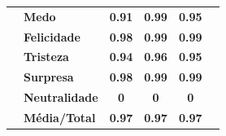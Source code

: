 \documentclass{beamer}
\begin{document}
\begin{frame}
\begin{table}[]
\begin{tabular}{llcccc}
                                       & \textbf{Medo}         & \textbf{0.91}                         & \textbf{0.99}                          & \textbf{0.95}                         &                                       \\
                                       & \textbf{Felicidade}   & \textbf{0.98}                         & \textbf{0.99}                          & \textbf{0.99}                         &                                       \\
                                       & \textbf{Tristeza}     & \textbf{0.94}                         & \textbf{0.96}                          & \textbf{0.95}                         &                                       \\
                                       & \textbf{Surpresa}     & \textbf{0.98}                         & \textbf{0.99}                          & \textbf{0.99}                         &                                       \\
                                       & \textbf{Neutralidade} & \textbf{0}                            & \textbf{0}                             & \textbf{0}                            &                                       \\
                                       & \textbf{Média/Total}  & \textbf{0.97}                         & \textbf{0.97}                          & \textbf{0.97}                         &                                       \\ \hline
\end{tabular}
\end{table} 
 
\end{frame}
\end{document}
